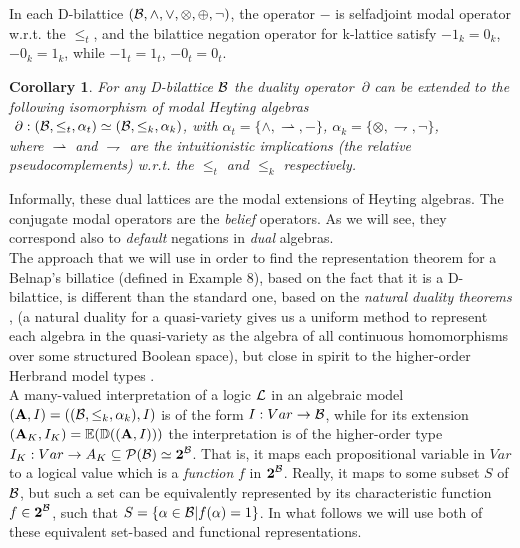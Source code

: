 \documentclass[10pt,twocolumn]{article}
\newtheorem{coro}{Corollary}
\begin{document}
In each  D-bilattice $(\mathcal{B}, \wedge, \vee, \otimes, \oplus, \neg)$,
the  operator $-$ is selfadjoint modal operator w.r.t. the $\leq_t$,
and   the bilattice negation operator for k-lattice satisfy $- 1_k
=0_k$, $- 0_k = 1_k$, while $- 1_t = 1_t$, $- 0_t = 0_t$.
\begin{coro} \cite{Majk07MV} \label{prop:d-billat}
For any D-bilattice $\mathcal{B}$ the duality operator $~\partial$ can be
extended to the following isomorphism of modal Heyting algebras \\
$~\partial:(\mathcal{B},\leq_t, \alpha_t) \simeq (\mathcal{B}, \leq_k, \alpha_k)$,
with $\alpha_t = \{\wedge, \rightharpoonup, - \}$,  $\alpha_k  = \{
\otimes, \rightharpoondown, \neg \}$,\\ where $\rightharpoonup$ and
$\rightharpoondown$ are the intuitionistic implications (the
relative pseudocomplements) w.r.t. the $\leq_t$ and $\leq_k$
respectively.
\end{coro}
Informally, these dual lattices are  the modal extensions of Heyting
algebras. The conjugate modal operators are the \emph{belief}
operators.
As we will see, they correspond also to \emph{default} negations in
\emph{dual}
algebras. \\
The approach that we will use in order to find the representation
theorem for a Belnap's billatice (defined in Example 8),  based on
the fact that it is a D-bilattice, is different than the standard
one, based on the \emph{natural duality theorems} \cite{ClDa98}, (a
natural duality for a quasi-variety gives us a uniform method to
represent each algebra in the quasi-variety as the algebra of all
continuous homomorphisms over some structured Boolean space), but
close in spirit to the higher-order Herbrand model types
\cite{Majk06}.\\ A many-valued interpretation of a logic $\mathcal{L}$ in an
algebraic model $(\textbf{A},I ) = ((\mathcal{B},\leq_k, \alpha_k), I)$ is of
the form $I:Var \rightarrow \mathcal{B}$, while for its extension
$(\textbf{A}_K, I_K)\\ = \mathbb{E}(\mathbb{D}((\textbf{A},I )))$
the interpretation is of the higher-order type $I_K:Var \rightarrow
A_K \subseteq \mathcal{P}(\mathcal{B})\simeq \textbf{2}^{\mathcal{B}}$. That is, it maps each
propositional variable in $Var$ to a logical value which is a
\emph{function} $f$ in $\textbf{2}^{\mathcal{B}}$. Really, it maps to some
subset $S$ of $\mathcal{B}$, but such a set can be equivalently represented
by its characteristic function $f \in \textbf{2}^{\mathcal{B}}$, such that $S
= \{\alpha \in \mathcal{B}|f(\alpha) =1\}$. In what follows we will use both
of these
equivalent set-based and functional representations.\\
\end{document}
